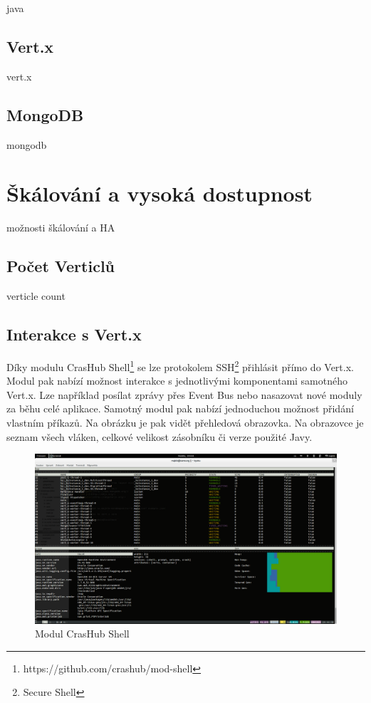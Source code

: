 java

\subsection{Vert.x}

vert.x

\subsection{MongoDB}

mongodb

\section{Škálování a vysoká dostupnost}\label{sub:Scaling}

možnosti škálování a HA

\subsection{Počet Verticlů}
verticle count

\subsection{Interakce s Vert.x}\label{sub:interaction}

Díky modulu CrasHub Shell\footnote{https://github.com/crashub/mod-shell} se lze protokolem SSH\footnote{Secure Shell} přihlásit přímo do Vert.x. Modul pak nabízí možnost interakce s jednotlivými komponentami samotného Vert.x. Lze například posílat zprávy přes Event Bus nebo nasazovat nové moduly za běhu celé aplikace. Samotný modul pak nabízí jednoduchou možnost přidání vlastním příkazů. Na obrázku je pak vidět přehledová obrazovka. Na obrazovce je seznam všech vláken, celkové velikost zásobníku či verze použité Javy. 

\begin{figure}
\begin{centering}
\includegraphics[scale=0.21]{obrazky/real_interaction}
\par\end{centering}
\caption{Modul CrasHub Shell\label{fig:real_interaction}}
\end{figure}

